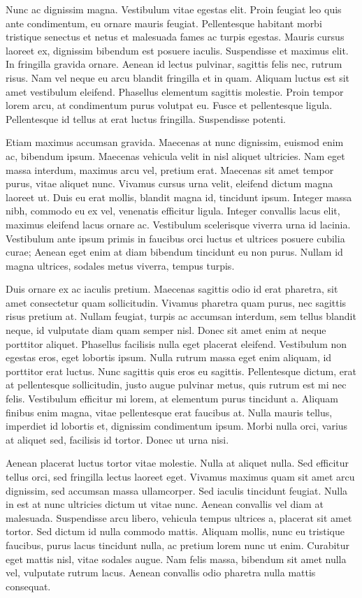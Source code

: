 \documentclass[
  a4paper,
  DIV=11,
  numbers=noendperiod]{scrreprt}
\begin{document}
Nunc ac dignissim magna. Vestibulum vitae egestas elit. Proin feugiat
leo quis ante condimentum, eu ornare mauris feugiat. Pellentesque
habitant morbi tristique senectus et netus et malesuada fames ac turpis
egestas. Mauris cursus laoreet ex, dignissim bibendum est posuere
iaculis. Suspendisse et maximus elit. In fringilla gravida ornare.
Aenean id lectus pulvinar, sagittis felis nec, rutrum risus. Nam vel
neque eu arcu blandit fringilla et in quam. Aliquam luctus est sit amet
vestibulum eleifend. Phasellus elementum sagittis molestie. Proin tempor
lorem arcu, at condimentum purus volutpat eu. Fusce et pellentesque
ligula. Pellentesque id tellus at erat luctus fringilla. Suspendisse
potenti.

Etiam maximus accumsan gravida. Maecenas at nunc dignissim, euismod enim
ac, bibendum ipsum. Maecenas vehicula velit in nisl aliquet ultricies.
Nam eget massa interdum, maximus arcu vel, pretium erat. Maecenas sit
amet tempor purus, vitae aliquet nunc. Vivamus cursus urna velit,
eleifend dictum magna laoreet ut. Duis eu erat mollis, blandit magna id,
tincidunt ipsum. Integer massa nibh, commodo eu ex vel, venenatis
efficitur ligula. Integer convallis lacus elit, maximus eleifend lacus
ornare ac. Vestibulum scelerisque viverra urna id lacinia. Vestibulum
ante ipsum primis in faucibus orci luctus et ultrices posuere cubilia
curae; Aenean eget enim at diam bibendum tincidunt eu non purus. Nullam
id magna ultrices, sodales metus viverra, tempus turpis.

Duis ornare ex ac iaculis pretium. Maecenas sagittis odio id erat
pharetra, sit amet consectetur quam sollicitudin. Vivamus pharetra quam
purus, nec sagittis risus pretium at. Nullam feugiat, turpis ac accumsan
interdum, sem tellus blandit neque, id vulputate diam quam semper nisl.
Donec sit amet enim at neque porttitor aliquet. Phasellus facilisis
nulla eget placerat eleifend. Vestibulum non egestas eros, eget lobortis
ipsum. Nulla rutrum massa eget enim aliquam, id porttitor erat luctus.
Nunc sagittis quis eros eu sagittis. Pellentesque dictum, erat at
pellentesque sollicitudin, justo augue pulvinar metus, quis rutrum est
mi nec felis. Vestibulum efficitur mi lorem, at elementum purus
tincidunt a. Aliquam finibus enim magna, vitae pellentesque erat
faucibus at. Nulla mauris tellus, imperdiet id lobortis et, dignissim
condimentum ipsum. Morbi nulla orci, varius at aliquet sed, facilisis id
tortor. Donec ut urna nisi.

Aenean placerat luctus tortor vitae molestie. Nulla at aliquet nulla.
Sed efficitur tellus orci, sed fringilla lectus laoreet eget. Vivamus
maximus quam sit amet arcu dignissim, sed accumsan massa ullamcorper.
Sed iaculis tincidunt feugiat. Nulla in est at nunc ultricies dictum ut
vitae nunc. Aenean convallis vel diam at malesuada. Suspendisse arcu
libero, vehicula tempus ultrices a, placerat sit amet tortor. Sed dictum
id nulla commodo mattis. Aliquam mollis, nunc eu tristique faucibus,
purus lacus tincidunt nulla, ac pretium lorem nunc ut enim. Curabitur
eget mattis nisl, vitae sodales augue. Nam felis massa, bibendum sit
amet nulla vel, vulputate rutrum lacus. Aenean convallis odio pharetra
nulla mattis consequat.
\end{document}
